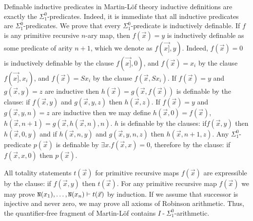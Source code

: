 \documentclass[a4paper,12pt]{article}
\newcommand{\Nat}               { {\tt N}  }
\newcommand{\hy}        { {\operatorname{-}}}
\begin{document}
Definable inductive predicates in Martin-L\"{o}f theory inductive definitions are exactly the $\Sigma^0_1$-predicates. Indeed, it is immediate that all inductive predicates are $\Sigma^0_1$-predicates. We prove that every $\Sigma^0_1$-predicate is inductively definable. If $f$ is any primitive recursive $n$-ary map, then $f(\vec{x}) = y$ is inductively definable as some predicate of arity $n+1$, which we denote as $f(\vec{x]},y)$. Indeed, $f(\vec{x})=0$ is inductively definable by the clause $f(\vec{x]},0)$, and $f(\vec{x})=x_i$ by the clause $f(\vec{x]},x_i)$, and $f(\vec{x})=Sx_i$ by the clause $f(\vec{x},Sx_i)$. If $f(\vec{x}) = y$ and $g(\vec{x},y) = z$ are inductive then $h(\vec{x}) = g(\vec{x},f(\vec{x}))$ is definable by the clause: if $f(\vec{x},y)$ and $g(\vec{x},y,z) $ then $h(\vec{x},z)$. If $f(\vec{x}) = y$ and $g(\vec{x},y,n) = z$ are inductive then we may define $h(\vec{x},0) = f(\vec{x})$, $h(\vec{x},n+1) = g(\vec{x},h(\vec{x},n),n)$. $h$ is definable by the clauses: if$f(\vec{x},y)$ then $h(\vec{x},0,y)$ and if $h(\vec{x},n,y)$ and $g(\vec{x},y,n,z)$ then $h(\vec{x},n+1,z)$. Any $\Sigma^0_1$-predicate $p(\vec{x})$ is definable by $\exists x.f(\vec{x},x)=0$, therefore by the clause: if $f(\vec{x},x,0)$ then $p(\vec{x})$.

All totality statements $t(\vec{x})$ for primitive recursive maps $f(\vec{x})$ are expressible by the clause: if $f(\vec{x},y)$ then $t(\vec{x})$. For any primitive recursive map $f(\vec{x})$ we may prove $\Nat(x_1), \ldots, \Nat(x_n) \vdash t(\vec{x})$ by induction. If we assume that successor is injective and never zero, we may prove all axioms of Robinson arithmetic. Thus, the quantifier-free fragment of Martin-L\"{o}f contains $I\hy \Sigma^0_1$-arithmetic.
\end{document}
